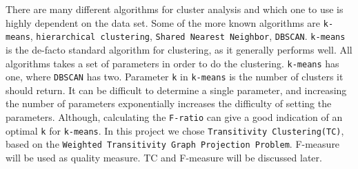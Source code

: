 \documentclass[a4paper,10pt]{article}
\theoremstyle{plain}
\theoremstyle{definition}
\begin{document}
There are many different algorithms for cluster analysis and which one to use is highly dependent on the data set. Some of the more known algorithms are \texttt{k-means}, \texttt{hierarchical clustering}, \texttt{Shared Nearest Neighbor}, \texttt{DBSCAN}. \texttt{k-means} is the de-facto standard algorithm for clustering, as it generally performs well. All algorithms takes a set of parameters in order to do the clustering. \texttt{k-means} has one, where \texttt{DBSCAN} has two. Parameter \texttt{k} in \texttt{k-means} is the number of clusters it should return. It can be difficult to determine a single parameter, and increasing the number of parameters exponentially increases the difficulty of setting the parameters. Although, calculating the \texttt{F-ratio} can give a good indication of an optimal \texttt{k} for \texttt{k-means}. In this project we chose \texttt{Transitivity Clustering(TC)}, based on the \texttt{Weighted Transitivity Graph Projection Problem}. F-measure will be used as quality measure. TC and F-measure will be discussed later.

\end{document}
